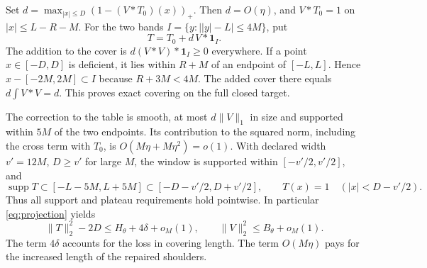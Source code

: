 \documentclass[11pt]{article}
\newcommand{\ind}{\mathbf1}
\newcommand{\norm}[1]{\lVert #1\rVert}
\DeclareMathOperator{\supp}{supp}
\begin{document}
Set \(d=\max_{|x|\le D}(1-(V*T_0)(x))_+\). Then \(d=O(\eta)\), and \(V*T_0=1\) on \(|x|\le L-R-M\). For the two bands \(I=\{y:\bigl||y|-L\bigr|\le4M\}\), put
\begin{equation}
 T=T_0+d\,V*\ind_I . \label{eq:fix}
\end{equation}
The addition to the cover is \(d(V*V)*\ind_I\ge0\) everywhere. If a point \(x\in[-D,D]\) is deficient, it lies within \(R+M\) of an endpoint of \([-L,L]\). Hence \(x-[-2M,2M]\subset I\) because \(R+3M<4M\). The added cover there equals \(d\int V*V=d\). This proves exact covering on the full closed target.

The correction to the table is smooth, at most \(d\norm V_1\) in size and supported within \(5M\) of the two endpoints. Its contribution to the squared norm, including the cross term with \(T_0\), is \(O(M\eta+M\eta^2)=o(1)\). With declared width \(v'=12M\), \(D\ge v'\) for large \(M\), the window is supported within \([-v'/2,v'/2]\), and
\[
 \supp T\subset[-L-5M,L+5M]\subset[-D-v'/2,D+v'/2],
 \qquad T(x)=1\quad(|x|<D-v'/2).
\]
Thus all support and plateau requirements hold pointwise. In particular \eqref{eq:projection} yields
\begin{equation}
 \norm T_2^2-2D\le H_\theta+4\delta+o_M(1),\qquad
 \norm V_2^2\le B_\theta+o_M(1). \label{eq:finalbudget}
\end{equation}
The term \(4\delta\) accounts for the loss in covering length. The term \(O(M\eta)\) pays for the increased length of the repaired shoulders.
\end{document}
